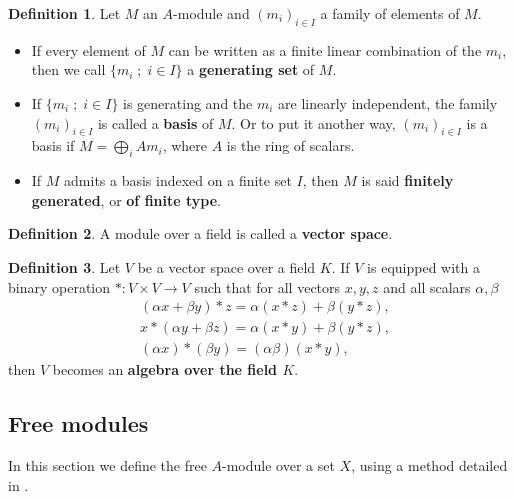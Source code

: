 \documentclass{report}
\theoremstyle{definition}
\newtheorem{defin}{Definition}
\theoremstyle{remark}
\begin{document}
  \begin{defin} 
  Let $M$ an $A$-module and $(m_i)_{i \in I}$ a family of elements of $M$.
  \begin{itemize}
      \item 
     If every element of $M$ can be written as a finite linear combination of the $m_i$, then we call $\{m_i\;;\;i \in I\}$ a \textbf{generating set} of $M$. 
  \item
  If $\{m_i\;;\;i \in I\}$ is generating and the $m_i$ are linearly independent, the family $(m_i)_{i \in I}$ is called a \textbf{basis} of $M$.
 Or to put it another way, $(m_i)_{i \in I}$ is a basis if $M = \bigoplus_i Am_i$, where $A$ is the ring of scalars.
  \item If $M$ admits a basis indexed on a finite set $I$, then $M$ is said \textbf{finitely generated}, or \textbf{of finite type}.
  \end{itemize} \end{defin}
  
  
  \begin{defin}
      A module over a field is called a \textbf{vector space}.
  \end{defin}
  
  \begin{defin}
      Let $V$ be a vector space over a field $K$. If  $V$ is equipped with a binary operation $*: V \times V \to V$ such that for all vectors $x,y,z$ and all scalars $\alpha,\beta$
        \begin{equation*}
        \begin{split}
        & (\alpha x + \beta y) * z = \alpha (x * z) + \beta (y * z), \\
        & x * (\alpha y + \beta z) = \alpha (x * y) + \beta (y * z), \\
        & (\alpha x) * (\beta y) = (\alpha \beta )(x * y),
        \end{split}  
        \end{equation*} then $V$ becomes an \textbf{algebra over the field $K$}.
  \end{defin}
  
 



\subsection{Free modules}

In this section we define the free $A$-module over a set $X$, using a method detailed in \cite{Godement}. 
\end{document}
